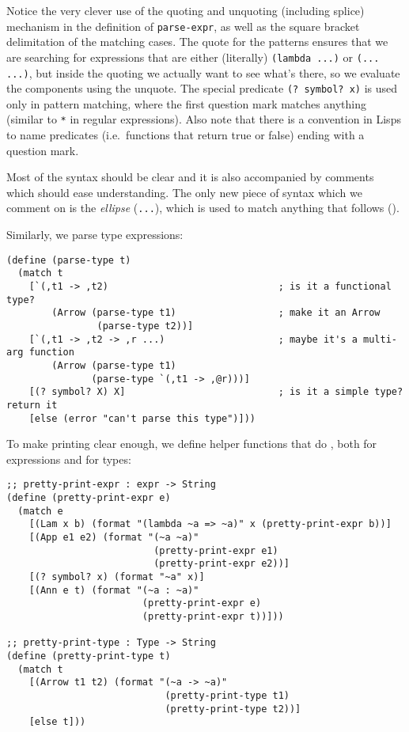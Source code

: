 Notice the very clever use of the quoting and unquoting (including splice)
mechanism in the definition of \texttt{parse-expr}, as well as the square bracket
delimitation of the matching cases. The quote for the patterns ensures that
we are searching for expressions that are either (literally) \texttt{(lambda ...)}
or \texttt{(... ...)}, but inside the quoting we actually want to see
what's there, so we evaluate the components using the unquote.
The special predicate \texttt{(? symbol? x)} is used only in pattern
matching, where the first question mark matches anything (similar to
\texttt{*} in regular expressions). Also note that there is a convention
in Lisps to name predicates (i.e.\ functions that return true or false)
ending with a question mark.

Most of the syntax should be clear and it is also accompanied by
comments which should ease understanding. The only new piece of syntax
which we comment on is the \emph{ellipse} (\texttt{...}), which is used
to match anything that follows ().

Similarly, we parse type expressions:
{
  \small
\begin{verbatim}
(define (parse-type t)
  (match t
    [`(,t1 -> ,t2)                              ; is it a functional type?
        (Arrow (parse-type t1)                  ; make it an Arrow
                (parse-type t2))]
    [`(,t1 -> ,t2 -> ,r ...)                    ; maybe it's a multi-arg function
        (Arrow (parse-type t1)
               (parse-type `(,t1 -> ,@r)))]
    [(? symbol? X) X]                           ; is it a simple type? return it
    [else (error "can't parse this type")]))
\end{verbatim}
}

To make printing clear enough, we define helper functions that do
, both for expressions and for types:
{
  \small
\begin{verbatim}
;; pretty-print-expr : expr -> String
(define (pretty-print-expr e)
  (match e
    [(Lam x b) (format "(lambda ~a => ~a)" x (pretty-print-expr b))]
    [(App e1 e2) (format "(~a ~a)"
                          (pretty-print-expr e1)
                          (pretty-print-expr e2))]
    [(? symbol? x) (format "~a" x)]
    [(Ann e t) (format "(~a : ~a)"
                        (pretty-print-expr e)
                        (pretty-print-expr t))]))

;; pretty-print-type : Type -> String
(define (pretty-print-type t)
  (match t
    [(Arrow t1 t2) (format "(~a -> ~a)"
                            (pretty-print-type t1)
                            (pretty-print-type t2))]
    [else t]))
\end{verbatim}
}

